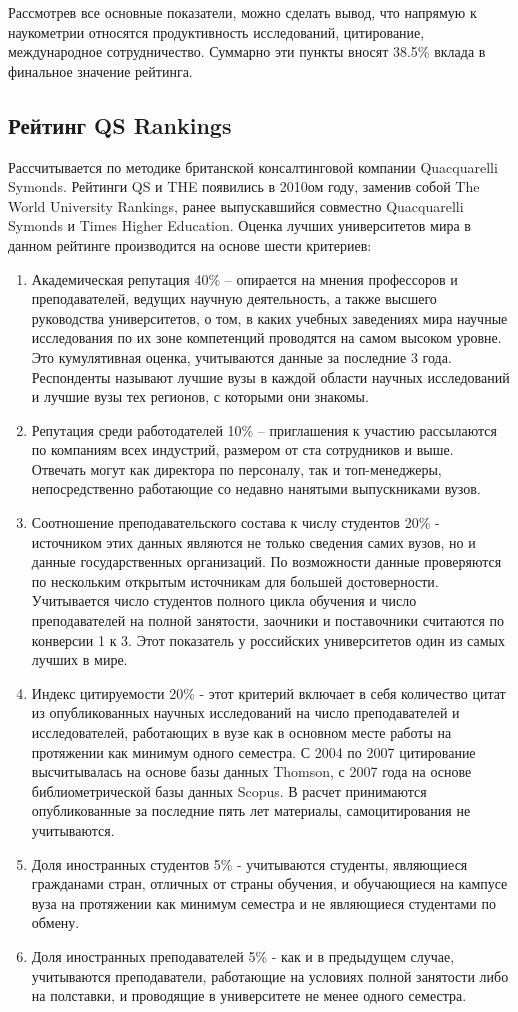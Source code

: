 Рассмотрев все основные показатели, можно сделать вывод, что напрямую к наукометрии относятся
продуктивность исследований, цитирование, международное сотрудничество. Суммарно
эти пункты вносят 38.5\% вклада в финальное значение рейтинга.

\subsection{Рейтинг QS Rankings}
Рассчитывается по методике британской консалтинговой компании Quacquarelli Symonds.
Рейтинги QS и THE появились в 2010ом году, заменив собой The World University Rankings,
ранее выпускавшийся совместно Quacquarelli Symonds и Times Higher Education.
Оценка лучших университетов мира в данном рейтинге производится на основе шести критериев:
\begin{enumerate}
\item Академическая репутация 40\% – опирается на мнения профессоров и преподавателей, ведущих научную деятельность, а также высшего руководства университетов, о том, в каких учебных заведениях мира научные исследования по их зоне компетенций проводятся на самом высоком уровне. Это кумулятивная оценка, учитываются данные за последние 3 года. Респонденты называют лучшие вузы в каждой области научных исследований и лучшие вузы тех регионов, с которыми они знакомы.
\item Репутация среди работодателей 10\% – приглашения к участию рассылаются по компаниям всех индустрий, размером от ста сотрудников и выше. Отвечать могут как директора по персоналу, так и топ-менеджеры, непосредственно работающие со недавно нанятыми выпускниками вузов.
\item Соотношение преподавательского состава к числу студентов 20\% - источником этих данных являются не только сведения самих вузов, но и данные государственных организаций. По возможности данные проверяются по нескольким открытым источникам для большей достоверности. Учитывается число студентов полного цикла обучения и число преподавателей на полной занятости, заочники и поставочники считаются по конверсии 1 к 3. Этот показатель у российских университетов один из самых лучших в мире.
\item Индекс цитируемости 20\% - этот критерий включает в себя количество цитат из опубликованных научных исследований на число преподавателей и исследователей, работающих в вузе как в основном месте работы на протяжении как минимум одного семестра. С 2004 по 2007 цитирование высчитывалась на основе базы данных Thomson, с 2007 года на основе библиометрической базы данных Scopus. В расчет принимаются опубликованные за последние пять лет материалы, самоцитирования не учитываются.
\item Доля иностранных студентов 5\% - учитываются студенты, являющиеся гражданами стран, отличных от страны обучения, и обучающиеся на кампусе вуза на протяжении как минимум семестра и не являющиеся студентами по обмену.
\item Доля иностранных преподавателей 5\% - как и в предыдущем случае, учитываются преподаватели, работающие на условиях полной занятости либо на полставки, и проводящие в университете не менее одного семестра.
\end{enumerate}

